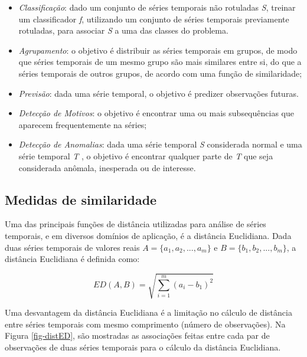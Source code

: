 \begin{itemize}
	\item \textit{Classificação}: dado um conjunto de séries temporais não rotuladas \textit{S}, treinar um classificador \textit{f}, utilizando um conjunto de séries temporais previamente rotuladas, para associar \textit{S} a uma das classes do problema.	
	\item \textit{Agrupamento}: o objetivo é distribuir as séries temporais em grupos, de modo que séries temporais de um mesmo grupo são mais similares entre si, do que  a séries temporais de  outros grupos, de acordo com uma função de similaridade; 
	\item \textit{Previsão}: dada uma série temporal, o objetivo é predizer observações futuras.
	\item \textit{Detecção de Motivos}: o objetivo é encontrar uma ou mais subsequências que aparecem frequentemente na séries;
	\item \textit{Detecção de Anomalias}: dada uma série temporal \textit{S} considerada normal e uma série temporal \textit{T} , o objetivo é encontrar qualquer parte de \textit{T} que seja considerada anômala, inesperada ou de interesse.
\end{itemize}

\subsection{Medidas de similaridade}

Uma das principais funções de distância utilizadas para análise de séries temporais, e em diversos domínios de aplicação, é a distância Euclidiana. Dada duas séries temporais de valores reais $A = \{a_1,a_2,...,a_m \}$ e $B = \{b_1,b_2,...,b_m \}$, a distância Euclidiana é definida como:

\begin{equation}
ED(A,B) = \sqrt{\sum_{i=1}^{m}(a_i - b_1)^2}
\end{equation}


Uma desvantagem da distância Euclidiana é a limitação no cálculo de distância entre séries temporais com mesmo comprimento (número de observações). Na Figura \ref{fig-distED}, são mostradas as associações feitas entre cada par de observações de duas séries temporais para o cálculo da distância Euclidiana.

